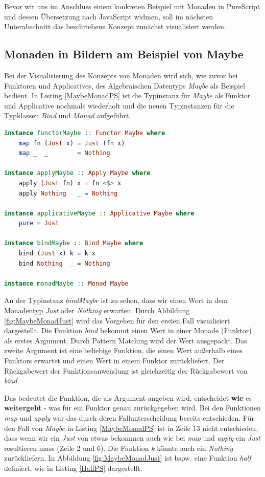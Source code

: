 \documentclass[
12pt,
ngerman,
oneside]
{scrbook} %
\begin{document}
Bevor wir uns im Anschluss einem konkreten Beispiel mit Monaden in PureScript und dessen Übersetzung nach JavaScript widmen, soll im nächsten Unterabschnitt das beschriebene Konzept zunächst visualisiert werden.

\subsection{Monaden in Bildern am Beispiel von Maybe}
Bei der Visualisierung des Konzepts von Monaden wird sich, wie zuvor bei Funktoren und Applicatives, des Algebraischen Datentyps \emph{Maybe} als Beispiel bedient. In Listing \ref{MaybeMonadPS} ist die Typinstanz für \emph{Maybe} als Funktor und Applicative nochmals wiederholt und die neuen Typinstanzen für die Typklassen \emph{Bind} und \emph{Monad} aufgeführt.

\begin{lstlisting}[language=purescript, style=numbered-and-boxed, caption=Monad-Instanz Maybe, label=MaybeMonadPS]
instance functorMaybe :: Functor Maybe where
	map fn (Just x) = Just (fn x)
	map _  _        = Nothing

instance applyMaybe :: Apply Maybe where
	apply (Just fn) x = fn <$> x
	apply Nothing   _ = Nothing

instance applicativeMaybe :: Applicative Maybe where
	pure = Just

instance bindMaybe :: Bind Maybe where
	bind (Just x) k = k x
	bind Nothing  _ = Nothing
	
instance monadMaybe :: Monad Maybe
\end{lstlisting}

An der Typinstanz \emph{bindMaybe} ist zu sehen, dass wir einen Wert in dem Monadentyp \emph{Just} oder \emph{Nothing} erwarten. Durch Abbildung \ref{fig:MaybeMonadJust} wird das Vorgehen für den ersten Fall visualisiert dargestellt. Die Funktion \emph{bind} bekommt einen Wert in einer Monade (Funktor) als erstes Argument. Durch Pattern Matching wird der Wert ausgepackt. Das zweite Argument ist eine beliebige Funktion, die einen Wert außerhalb eines Funktors erwartet und einen Wert in einem Funktor zurückliefert. Der Rückgabewert der Funktionsanwendung ist gleichzeitig der Rückgabewert von \emph{bind}.

Das bedeutet die Funktion, die als Argument angeben wird, entscheidet \textbf{wie} es \textbf{weitergeht} - was für ein Funktor genau zurückgegeben wird. Bei den Funktionen \emph{map} und \emph{apply} war das durch deren Fallunterscheidung bereits entschieden. Für den Fall von \emph{Maybe} in Listing \ref{MaybeMonadPS} ist in Zeile 13 nicht entschieden, dass wenn wir ein \emph{Just} von etwas bekommen auch wie bei \emph{map} und \emph{apply} ein \emph{Just} resultieren muss (Zeile 2 und 6). Die Funktion \emph{k} könnte auch ein \emph{Nothing} zurückliefern. In Abbildung \ref{fig:MaybeMonadJust} ist bspw. eine Funktion \emph{half} definiert, wie in Listing \ref{HalfPS} dargestellt.
\end{document}
